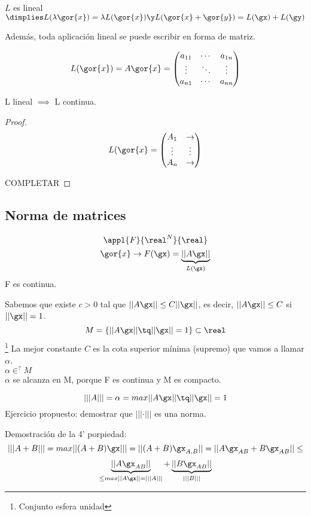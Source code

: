\documentclass{apuntes}
\begin{document}
$L$ es lineal $\dimplies L(\lambda \gor{x}) = \lambda L(\gor{x}) \y L(\gor{x}+\gor{y}) = L(\gx)+L(\gy)$

Además, toda aplicación lineal se puede escribir en forma de matriz.

\[L(\gor{x})=A\gor{x} =
\begin{pmatrix}
a_{11} 	& \cdots & a_{1n}		\\
\vdots	& \ddots &  \vdots 	\\
a_{n1}	& \cdots & a_{nn} 
\end{pmatrix}\]

\begin{theorem}
 L lineal $\implies$ L continua.
\end{theorem}
\begin{proof}
 $$L(\gor{x} = \left(
 \begin{matrix}
  A_1 & \rightarrow \\
  \vdots & \vdots\\
  A_n & \rightarrow
 \end{matrix}\right)$$
 
 COMPLETAR

\end{proof}
\subsection{Norma de matrices}
$$\appl{F}{\real^N}{\real}$$
$$\gor{x} \rightarrow F(\gx) = \underbrace{||A\gx||}_{L(\gx)}$$
F es continua.

Sabemos que existe $c>0$ tal que $||A\gx|| \leq C||\gx||$, es decir,  $||A\gx||\leq C$ si $||\gx||=1$.
$$M = \{||A\gx|| \tq ||\gx||=1\}\subset \real$$\footnote{Conjunto esfera unidad}
La mejor constante $C$ es la cota superior mínima (supremo) que vamos a llamar $\alpha$.\\
$\alpha \in^{?} M$\\
$\alpha$ se alcanza en M, porque F es continua y M es compacto.


\begin{defn}
$$|||A||| = \alpha = max{||A\gx||\tq||\gx||=1}$$
Ejercicio propuesto: demostrar que $|||\cdot|||$ es una norma.
\end{defn}
Demostración de la 4' porpiedad:
$$|||A+B||| = max{||(A+B)\gx|||} = ||(A+B)\gx_{A,B}|| = ||A\gx_{AB} + B\gx_{AB}|| \leq$$
$$
\underbrace{||A\gx_{AB}||}_{\leq max||A\gx|| =
|||A|||} + \underbrace{||B\gx_{AB}||}_{|||B|||} $$
\end{document}
